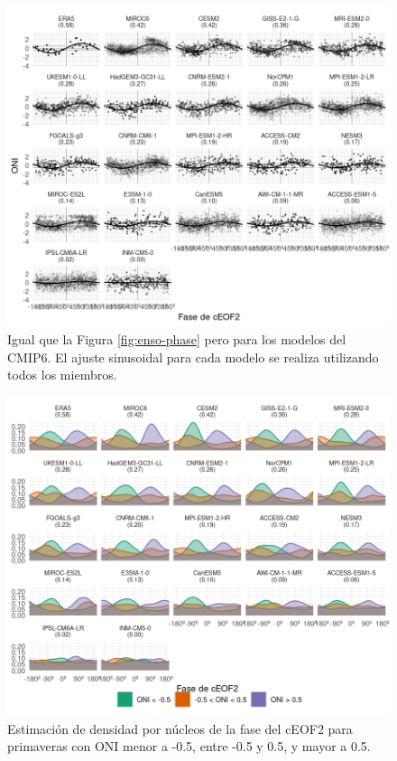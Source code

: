 \documentclass[12pt,oneside,a4paper]{reedthesis}
\begin{document}
\begin{figure}

{\centering \includegraphics{figures/50-cmip6/enso-phase-cmip-1} 

}

\caption{Igual que la Figura \ref{fig:enso-phase} pero para los modelos del CMIP6. El ajuste sinusoidal para cada modelo se realiza utilizando todos los miembros.}\label{fig:enso-phase-cmip}
\end{figure}



\begin{figure}

{\centering \includegraphics{figures/50-cmip6/arg-enso-density-1} 

}

\caption{Estimación de densidad por núcleos de la fase del cEOF2 para primaveras con ONI menor a -0.5, entre -0.5 y 0.5, y mayor a 0.5.}\label{fig:arg-enso-density}
\end{figure}
\end{document}
